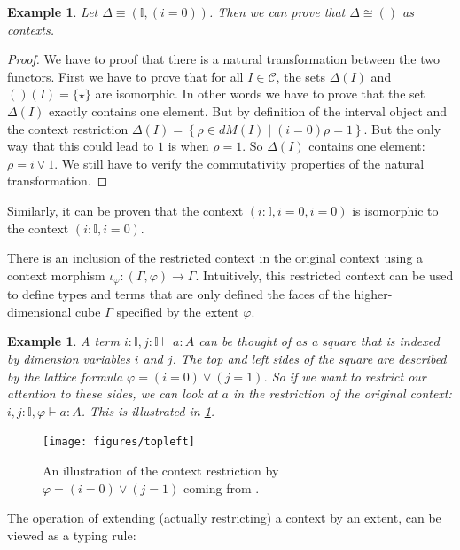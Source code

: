 \documentclass[12pt,a4paper,twoside,xetex,draft]{book}
\newtheorem{example}[theorem]{Example}
\begin{document}
\begin{example}
Let $\Delta \equiv (\mathbb{I}, (i=0))$. Then we can prove that $\Delta \cong ()$ as contexts.
\end{example} 

\begin{proof}
We have to proof that there is a natural transformation between the two functors. First we have to prove that for all $I \in \mathcal{C}$, the sets $\Delta (I)$ and $()(I)=\{\star \}$ are isomorphic. In other words we have to prove that the set $\Delta (I)$ exactly contains one element. But by definition of the interval object and the context restriction $\Delta (I) = \left\{  \rho \in dM(I) \mid (i=0) \rho = 1 \right\}$. But the only way that this could lead to $1$ is when $\rho = 1$. So $\Delta (I)$ contains one element: $\rho = i \vee 1$. We still have to verify the commutativity properties of the natural transformation.
\end{proof}
 
 Similarly, it can be proven that the context $(i: \mathbb{I}, i=0, i=0)$ is isomorphic to the context $(i : \mathbb{I}, i = 0)$.

 
 
There is an inclusion of the restricted context in the original context using a context morphism $\iota_{\varphi} : (\Gamma , \varphi ) \rightarrow \Gamma $. Intuitively, this restricted context can be used to define types and terms that are only defined the faces of the higher-dimensional cube $\Gamma$ specified by the extent $\varphi$.  

\begin{example}
A term $i : \mathbb{I}, j: \mathbb{I} \vdash a : A$ can be thought of as a square that is indexed by dimension variables $i$ and $j$. The top and left sides of the square are described by the lattice formula $\varphi = (i=0) \vee (j=1)$. So if we want to restrict our attention to these sides, we can look at $a$ in the restriction of the original context: $i , j : \mathbb{I},  \varphi \vdash a : A$. This is illustrated in \cref{topleft}.
\end{example}

\begin{figure}
\centering
\texttt{[image: figures/topleft]}
\caption{An illustration of the context restriction by $\varphi = (i=0) \vee (j=1)$ coming from \cite{Orton2019}.\label{topleft}}
\end{figure}


The operation of extending (actually restricting) a context by an extent, can be viewed as a typing rule: 
\end{document}
